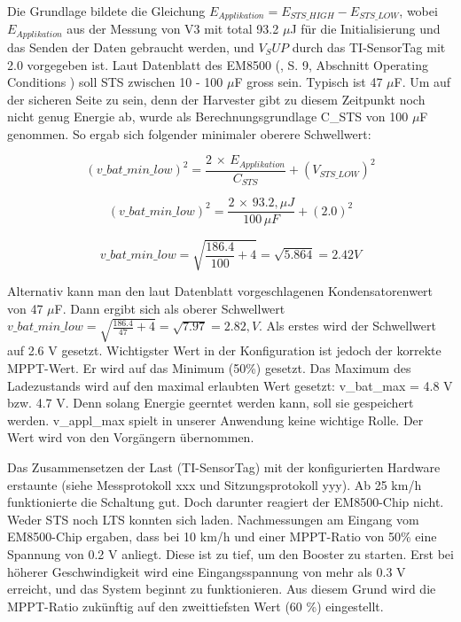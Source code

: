 Die Grundlage bildete die Gleichung  $E_{Applikation}= E_{STS\_HIGH} - E_{STS\_LOW}$, wobei  $E_{Applikation}$ aus der Messung von V3 mit total 93.2 $\mu$J für die Initialisierung und das Senden der Daten gebraucht werden, und $V_SUP$ durch das TI-SensorTag mit 2.0 vorgegeben ist. Laut Datenblatt des EM8500 (\cite{datasheet_EM85}, S. 9, Abschnitt Operating Conditions ) soll STS zwischen 10 - 100 $\mu$F gross sein. Typisch ist 47 $\mu$F. Um auf der sicheren Seite zu sein, denn der Harvester gibt zu diesem Zeitpunkt noch nicht genug Energie ab, wurde als Berechnungsgrundlage C\_{STS} von 100 $\mu$F genommen.  So ergab sich folgender minimaler oberere Schwellwert:

\begin{equation}
(v\_bat\_min\_low) ^2  =  \frac{2\, \times \, E_{Applikation}}{C_{STS}} + (V_{STS\_LOW})^2
\end{equation}

\begin{equation}
(v\_bat\_min\_low) ^2  =  \frac{2\, \times \, 93.2, \mu J}{100 \,\mu F} + (2.0)^2
\end{equation}

\begin{equation}
v\_bat\_min\_low  =  \sqrt{\frac{186.4}{100 } + 4} = \sqrt{5.864} = 2.42 V
\end{equation}

Alternativ kann man den laut Datenblatt vorgeschlagenen Kondensatorenwert von  47 $\mu$F. Dann ergibt sich als oberer Schwellwert  $v\_bat\_min\_low  =  \sqrt{\frac{186.4}{47 } + 4} = \sqrt{7.97} = 2.82, V$. Als erstes wird der Schwellwert auf 2.6 V gesetzt. Wichtigster Wert in der Konfiguration ist jedoch der korrekte MPPT-Wert. Er wird auf das Minimum (50\thinspace\%) gesetzt. Das Maximum des Ladezustands  wird auf den maximal erlaubten Wert gesetzt: v\_bat\_max  = 4.8 V bzw. 4.7 V. Denn solang Energie geerntet werden kann, soll sie gespeichert werden. v\_appl\_max spielt in unserer Anwendung keine wichtige Rolle. Der Wert wird von den Vorgängern übernommen.

Das Zusammensetzen der Last (TI-SensorTag) mit der konfigurierten Hardware erstaunte (siehe Messprotokoll xxx und Sitzungsprotokoll yyy). Ab 25 km/h funktionierte die Schaltung gut. Doch darunter reagiert der EM8500-Chip nicht. Weder STS noch LTS konnten sich laden. Nachmessungen am Eingang vom EM8500-Chip ergaben, dass bei  10 km/h und einer MPPT-Ratio von 50\thinspace\% eine Spannung von 0.2 V anliegt. Diese ist zu tief, um den Booster zu starten. Erst bei höherer Geschwindigkeit wird eine Eingangsspannung von mehr als 0.3 V erreicht, und das System beginnt zu funktionieren. Aus diesem Grund wird die MPPT-Ratio zukünftig auf den zweittiefsten Wert (60 \thinspace\%) eingestellt. 

